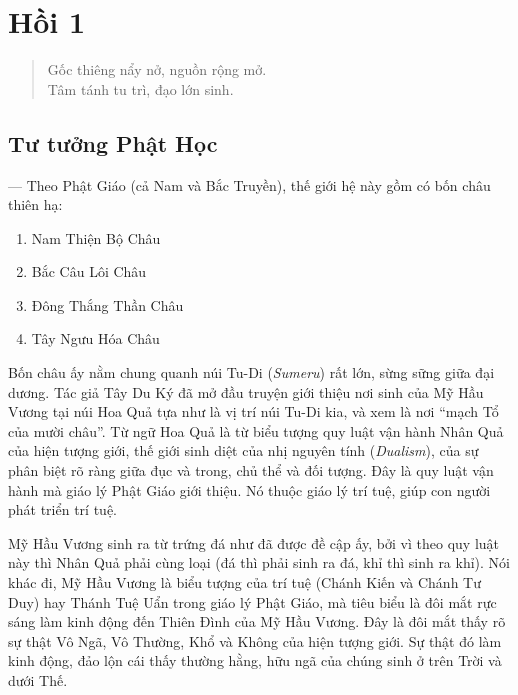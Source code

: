 \chapter{Hồi 1} %
\label{cha:hoi_thu_1}

\begin{verse}
\begin{itshape}
Gốc thiêng nẩy nở, nguồn rộng mở.\\
Tâm tánh tu trì, đạo lớn sinh.
\end{itshape}
\end{verse}

\section{Tư tưởng Phật Học} %
\label{sec:hoi_1_tu_tuong_phat_hoc}

--- Theo Phật Giáo (cả Nam và Bắc Truyền), thế giới hệ này gồm có bốn châu thiên hạ:

\begin{multicols}{2}
\begin{enumerate}[label=\itshape\arabic*\upshape/]
    \item Nam Thiện Bộ Châu

    \item Bắc Câu Lôi Châu

    \item Đông Thắng Thần Châu

    \item Tây Ngưu Hóa Châu
\end{enumerate}
\end{multicols}

Bốn châu ấy nằm chung quanh núi Tu-Di (\emph{Sumeru}) rất lớn, sừng sững giữa đại dương. Tác giả Tây Du Ký đã mở đầu truyện giới thiệu nơi sinh của Mỹ Hầu Vương tại núi Hoa Quả tựa như là vị trí núi Tu-Di kia, và xem là nơi ``mạch Tổ của mười châu''. Từ ngữ Hoa Quả là từ biểu tượng quy luật vận hành Nhân Quả của hiện tượng giới, thế giới sinh diệt của nhị nguyên tính (\emph{Dualism}), của sự phân biệt rõ ràng giữa đục và trong, chủ thể và đối tượng. Đây là quy luật vận hành mà giáo lý Phật Giáo giới thiệu. Nó thuộc giáo lý trí tuệ, giúp con người phát triển trí tuệ.

Mỹ Hầu Vương sinh ra từ trứng đá như đã được đề cập ấy, bởi vì theo quy luật này thì Nhân Quả phải cùng loại (đá thì phải sinh ra đá, khỉ thì sinh ra khỉ). Nói khác đi, Mỹ Hầu Vương là biểu tượng của trí tuệ (Chánh Kiến và Chánh Tư Duy) hay Thánh Tuệ Uẩn trong giáo lý Phật Giáo, mà tiêu biểu là đôi mắt rực sáng làm kinh động đến Thiên Đình của Mỹ Hầu Vương. Đây là đôi mắt thấy rõ sự thật Vô Ngã, Vô Thường, Khổ và Không của hiện tượng giới. Sự thật đó làm kinh động, đảo lộn cái thấy thường hằng, hữu ngã của chúng sinh ở trên Trời và dưới Thế.

